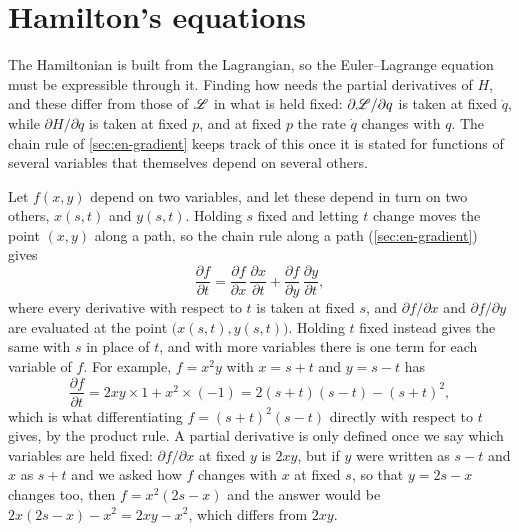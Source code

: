 \section{Hamilton's equations}
\label{sec:ha-equations}

The Hamiltonian is built from the Lagrangian, so the Euler--Lagrange
equation must be expressible through it. Finding how needs the partial
derivatives of $H$, and these differ from those of $\mathscr{L}$ in what is held
fixed: $\partial\mathscr{L}/\partial q$ is taken at fixed $\dot{q}$, while
$\partial H/\partial q$ is taken at fixed $p$, and at fixed $p$ the rate
$\dot{q}$ changes with $q$. The chain rule of \cref{sec:en-gradient}
keeps track of this once it is stated for functions of several
variables that themselves depend on several others.

\begin{toolbox}
Let $f(x, y)$ depend on two variables, and let these depend in turn on
two others, $x(s, t)$ and $y(s, t)$. Holding $s$ fixed and letting $t$
change moves the point $(x, y)$ along a path, so the chain rule along a
path (\cref{sec:en-gradient}) gives
\begin{equation*}
   \frac{\partial f}{\partial t} = \frac{\partial f}{\partial x}\,
   \frac{\partial x}{\partial t} + \frac{\partial f}{\partial y}\,
   \frac{\partial y}{\partial t} ,
\end{equation*}
where every derivative with respect to $t$ is taken at fixed $s$, and
$\partial f/\partial x$ and $\partial f/\partial y$ are evaluated at the
point $\bigl(x(s, t), y(s, t)\bigr)$. Holding $t$ fixed instead gives
the same with $s$ in place of $t$, and with more variables there is one
term for each variable of $f$. For example, $f = x^2y$ with $x = s + t$
and $y = s - t$ has
\begin{equation*}
   \frac{\partial f}{\partial t} = 2xy\times1 + x^2\times(-1)
   = 2(s + t)(s - t) - (s + t)^2 ,
\end{equation*}
which is what differentiating $f = (s + t)^2(s - t)$ directly with respect
to $t$ gives, by the product rule. A partial derivative is only defined
once we say which variables are held fixed: $\partial f/\partial x$ at
fixed $y$ is $2xy$, but if $y$ were written as $s - t$ and $x$ as $s + t$
and we asked how $f$ changes with $x$ at fixed $s$, so that $y = 2s - x$
changes too, then $f = x^2(2s - x)$ and the answer would be $2x(2s - x) -
x^2 = 2xy - x^2$, which differs from $2xy$.
\end{toolbox}


